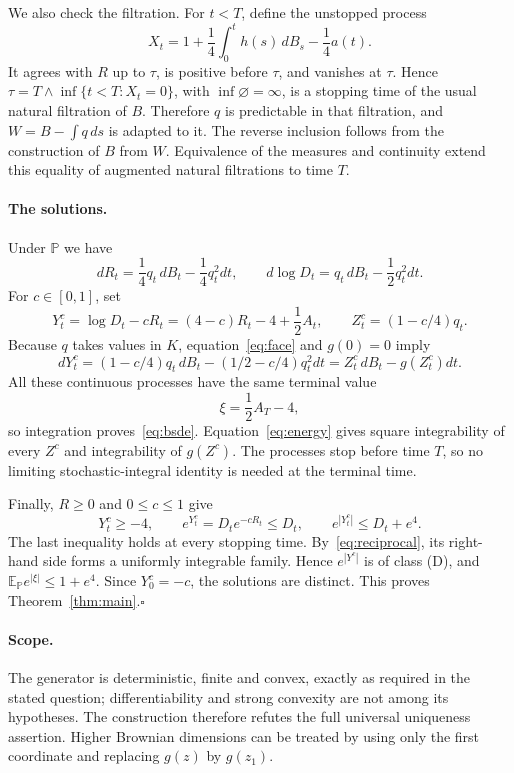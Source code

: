 \documentclass[11pt]{article}
\begin{document}
We also check the filtration. For $t<T$, define the unstopped process
\[
 X_t=1+\frac14\int_0^t h(s)\,dB_s-\frac14a(t).
\]
It agrees with $R$ up to $\tau$, is positive before $\tau$, and vanishes at $\tau$. Hence $\tau=T\wedge\inf\{t<T:X_t=0\}$, with $\inf\varnothing=\infty$, is a stopping time of the usual natural filtration of $B$. Therefore $q$ is predictable in that filtration, and $W=B-\int q\,ds$ is adapted to it. The reverse inclusion follows from the construction of $B$ from $W$. Equivalence of the measures and continuity extend this equality of augmented natural filtrations to time $T$.

\paragraph{The solutions.}
Under $\mathbb P$ we have
\[
 dR_t=\frac14q_t\,dB_t-\frac14q_t^2dt,
 \qquad d\log D_t=q_t\,dB_t-\frac12q_t^2dt.
\]
For $c\in[0,1]$, set
\begin{equation}\label{eq:solutions}
 Y^c_t=\log D_t-cR_t=(4-c)R_t-4+\frac12A_t,
 \qquad Z^c_t=(1-c/4)q_t.
\end{equation}
Because $q$ takes values in $K$, equation~\eqref{eq:face} and $g(0)=0$ imply
\[
 dY^c_t=(1-c/4)q_t\,dB_t-(1/2-c/4)q_t^2dt
       =Z^c_t\,dB_t-g(Z^c_t)dt.
\]
All these continuous processes have the same terminal value
\[
 \xi=\frac12A_T-4,
\]
so integration proves~\eqref{eq:bsde}. Equation~\eqref{eq:energy} gives square integrability of every $Z^c$ and integrability of $g(Z^c)$. The processes stop before time $T$, so no limiting stochastic-integral identity is needed at the terminal time.

Finally, $R\geq0$ and $0\leq c\leq1$ give
\[
 Y^c_t\geq-4,\qquad e^{Y^c_t}=D_te^{-cR_t}\leq D_t,
 \qquad e^{|Y^c_t|}\leq D_t+e^4.
\]
The last inequality holds at every stopping time. By~\eqref{eq:reciprocal}, its right-hand side forms a uniformly integrable family. Hence $e^{|Y^c|}$ is of class (D), and $\mathbb E_{\mathbb P}e^{|\xi|}\leq1+e^4$. Since $Y^c_0=-c$, the solutions are distinct. This proves Theorem~\ref{thm:main}.\hfill$\square$

\paragraph{Scope.}
The generator is deterministic, finite and convex, exactly as required in the stated question; differentiability and strong convexity are not among its hypotheses. The construction therefore refutes the full universal uniqueness assertion. Higher Brownian dimensions can be treated by using only the first coordinate and replacing $g(z)$ by $g(z_1)$.
\end{document}
